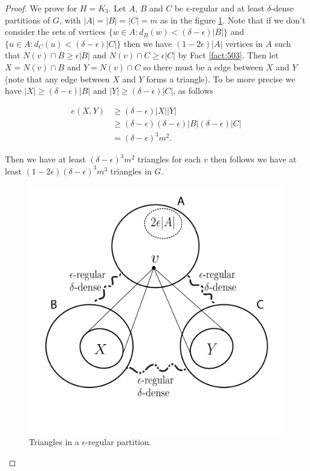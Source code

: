 \documentclass[12pt,twoside,a4paper]{book}
\numberwithin{equation}{section}
\theoremstyle{remark}
\begin{document}
\begin{proof}
We prove for $H=K_3$. Let %
 $A$, $B$ and $C$ be $\epsilon$-regular and at least $\delta$-dense partitions of $G$, with $|A|=|B|=|C|=m$ as in the figure \ref{fig:embeddinglemma}. Note that if we don't consider the sets of vertices $\{w\in A \colon d_B(w) < (\delta - \epsilon)|B| \}$  and $\{u\in A \colon d_C(u) < (\delta - \epsilon)|C| \}$ then we have $(1-2\epsilon)|A|$ vertices in $A$ such that $N(v) \cap B \geq \epsilon |B|$ and $N(v) \cap C \geq \epsilon |C|$ by Fact \ref{fact:503}. Then let $X = N(v) \cap B$ and $Y =N(v) \cap C$ so there must be a edge between $X$ and $Y$ (note that any edge between $X$ and $Y$ forms a triangle). To be more precise we have $|X| \geq (\delta - \epsilon)|B|$ and $|Y| \geq (\delta - \epsilon)|C|$, as follows

\begin{align*}
e(X,Y) &\geq (\delta - \epsilon)|X||Y|\\
& \geq (\delta - \epsilon)  (\delta - \epsilon)|B|  (\delta - \epsilon)|C|\\
& =  (\delta - \epsilon)^3 m^2.
\end{align*}

Then we have at least $ (\delta - \epsilon)^3 m^2$ triangles for each $v$ then follows we have at least $(1-2\epsilon) (\delta-\epsilon)^3 m^3$ triangles in $G$. 

\begin{figure}[H]
     \centering
     \includegraphics[scale=1]{Figuras/embedding-lemma.jpg}
     \caption{Triangles in a $\epsilon$-regular partition.}
     \label{fig:embeddinglemma}
\end{figure}

\end{proof}
\end{document}
